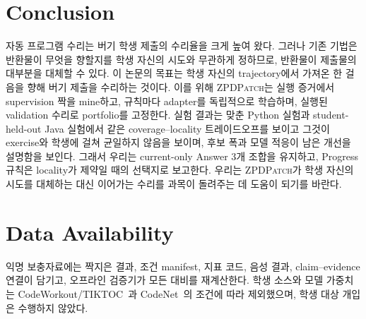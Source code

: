 \documentclass[10pt,conference]{IEEEtran}
\begin{document}
\section{Conclusion}
\label{sec:conclusion}
자동 프로그램 수리는 버기 학생 제출의 수리율을 크게 높여 왔다. 그러나 기존 기법은 반환물이 무엇을 향할지를 학생 자신의 시도와 무관하게 정하므로, 반환물이 제출물의 대부분을 대체할 수 있다. 이 논문의 목표는 학생 자신의 trajectory에서 가져온 한 걸음을 향해 버기 제출을 수리하는 것이다. 이를 위해 \textsc{ZPDPatch}는 실행 증거에서 supervision 짝을 mine하고, 규칙마다 adapter를 독립적으로 학습하며, 실행된 validation 수리로 portfolio를 고정한다. 실험 결과는 맞춘 Python 실험과 student-held-out Java 실험에서 같은 coverage--locality 트레이드오프를 보이고 그것이 exercise와 학생에 걸쳐 균일하지 않음을 보이며, 후보 폭과 모델 적응이 남은 개선을 설명함을 보인다. 그래서 우리는 current-only Answer 3개 조합을 유지하고, Progress 규칙은 locality가 제약일 때의 선택지로 보고한다. 우리는 \textsc{ZPDPatch}가 학생 자신의 시도를 대체하는 대신 이어가는 수리를 과목이 돌려주는 데 도움이 되기를 바란다.

\section*{Data Availability}
익명 보충자료에는 짝지은 결과, 조건 manifest, 지표 코드, 음성 결과, claim--evidence 연결이 담기고, 오프라인 검증기가 모든 대비를 재계산한다. 학생 소스와 모델 가중치는 CodeWorkout/TIKTOC~\cite{duan2024tiktoc}과 CodeNet~\cite{puri2021codenet}의 조건에 따라 제외했으며, 학생 대상 개입은 수행하지 않았다.
\end{document}
